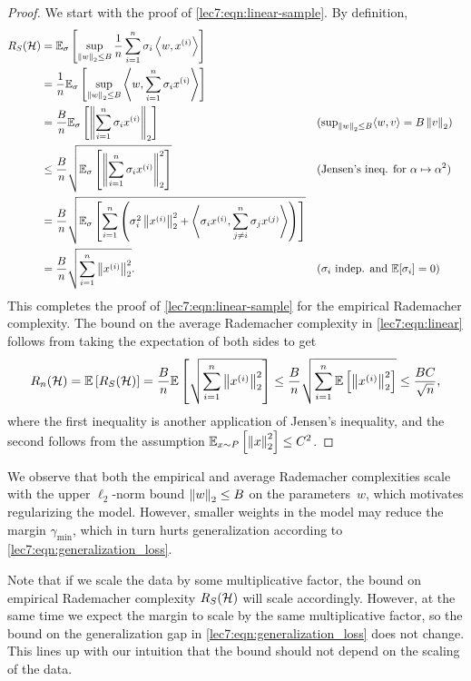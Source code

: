 \begin{proof}
We start with the proof of \eqref{lec7:eqn:linear-sample}. By definition,
\begin{align}
    R_S(\mathcal{H}) 
    &= \mathbb{E}_\sigma\left[ \sup_{\left\|w\right\|_2 \le B} \frac{1}{n} \sum_{i=1}^n\sigma_i \left\langle w,x^{(i)}\right\rangle \right]
    \\&= \frac{1}{n} \mathbb{E}_\sigma\left[ \sup_{\left\|w\right\|_2 \le B} \left\langle w,\sum_{i=1}^n\sigma_i x^{(i)}\right\rangle \right]
    \\&= \frac{B}{n} \mathbb{E}_\sigma\left[ \left\|\sum_{i=1}^n \sigma_i  x^{(i)}\right\|_2 \right]
        &&\text{($\textstyle\sup_{\left\|w\right\|_2 \le B} \langle w,v\rangle =B\left\|v\right\|_2$)}
    \\&\leq \frac{B}{n} \sqrt{ \mathbb{E}_\sigma\left[\left\| \sum_{i=1}^n \sigma_i x^{(i)} \right\|_2^2\right] }
        &&\text{(Jensen's ineq. for $\alpha \mapsto \alpha^2$)} 
    \\&= \frac{B}{n} \sqrt{ \mathbb{E}_\sigma \left[\sum_{i=1}^n \left(\sigma_i^2 \left\|x^{(i)}\right\|_2^2 + \left\langle\sigma_ix^{(i)},\sum_{j \ne i}^n \sigma_j x^{(j)}\right\rangle \right)\right] }
    \\&= \frac{B}{n} \sqrt{\sum_{i=1}^n \left\|x^{(i)}\right\|_2^2}.
        &&\text{($\sigma_i$ indep. and $\mathbb{E}[\sigma_i]=0$)}
\end{align}
This completes the proof of \eqref{lec7:eqn:linear-sample} for the empirical Rademacher complexity. The bound on the average Rademacher complexity in \eqref{lec7:eqn:linear} follows from taking the expectation of both sides to get
\begin{equation}
    R_n(\mathcal{H}) = \mathbb{E}\left[ R_S(\mathcal{H}) \right]
    = \frac{B}{n} \mathbb{E}\left[ \sqrt{\sum_{i=1}^n \left\|x^{(i)}\right\|_2^2} \right]
    \le \frac{B}{n} \sqrt{ \sum_{i=1}^n \mathbb{E}\left[\left\|x^{(i)}\right\|_2^2\right] }
    \le \frac{BC}{\sqrt{n}},
\end{equation}
where the first inequality is another application of Jensen's inequality, and the second follows from the assumption $\operatorname*{\mathbb{E}}_{x \sim P}\left[\left\|x\right\|_2^2\right] \leq C^2$.

\end{proof}

We observe that both the empirical and average Rademacher complexities scale with the upper $\ell_2$-norm bound $\left\|w\right\|_2 \le B$ on the parameters~$w$, which motivates regularizing the model. However, smaller weights in the model may reduce the margin $\gamma_\mathrm{min}$, which in turn hurts generalization according to \eqref{lec7:eqn:generalization_loss}.

\begin{remark}
Note that if we scale the data by some multiplicative factor, the bound on empirical Rademacher complexity $R_S(\mathcal H)$ will scale accordingly. However, at the same time we expect the margin to scale by the same multiplicative factor, so the bound on the generalization gap in \eqref{lec7:eqn:generalization_loss} does not change. This lines up with our intuition that the bound should not depend on the scaling of the data.
\end{remark}

